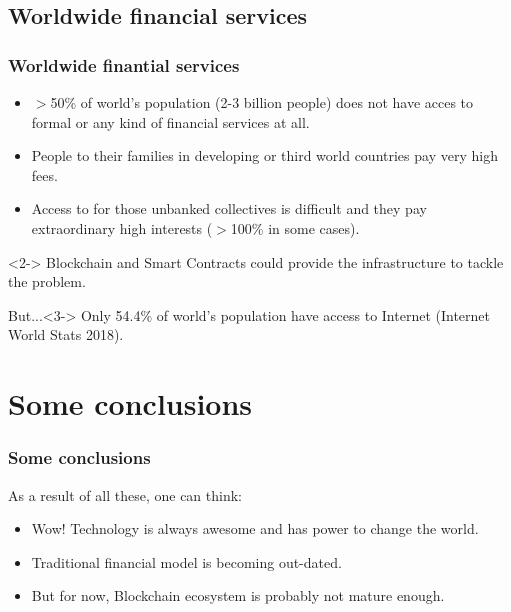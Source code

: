 \documentclass[notitlepage, usenames,dvipsnames]{beamer}
\newcommand{\st}{\structure}
\begin{document}
    \subsection{Worldwide financial services}
    \begin{frame}
        \frametitle{Worldwide finantial services}

        \begin{itemize}\itemsep=1.35ex
            \item $>$50\% of world's population ({\footnotesize 2-3 billion people}) does not have acces to formal or any kind of financial services at all.
            \item People \st{sending money} to their families in developing or third world countries pay \alert{very high} fees.
            \item Access to \st{loans} for those unbanked collectives is difficult and they pay \alert{extraordinary high} interests ({\footnotesize $>$100\% in some cases}).
        \end{itemize}


        \begin{exampleblock}{}<2->
            Blockchain and Smart Contracts could provide the infrastructure to tackle the problem.
        \end{exampleblock}

        \begin{alertblock}{But...}<3->
            Only 54.4\% of world's population have access to Internet ({\footnotesize Internet World Stats 2018}).
        \end{alertblock}

    \end{frame}


    \section{Some conclusions}
    \begin{frame}
        \frametitle{Some conclusions}

        As a result of all these, one can think:

        \begin{itemize}
            \item Wow! Technology is always awesome and has power to change the world.
            \item Traditional financial model is becoming out-dated.
            \item But for now, Blockchain ecosystem is probably not mature enough.
        \end{itemize}

    \end{frame}
\end{document}
